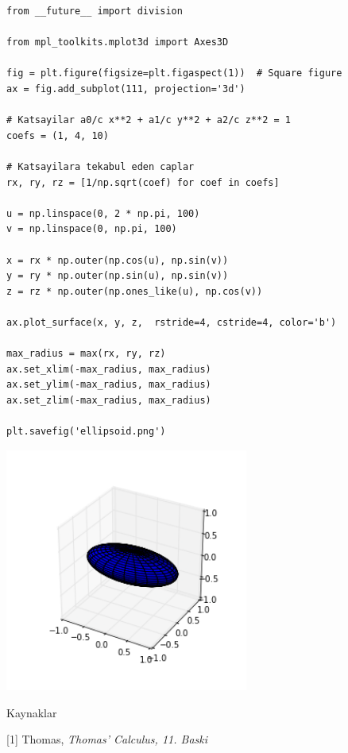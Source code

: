 \documentclass[12pt,fleqn]{article}\usepackage{../../common}
\begin{document}
\begin{verbatim}
from __future__ import division

from mpl_toolkits.mplot3d import Axes3D

fig = plt.figure(figsize=plt.figaspect(1))  # Square figure
ax = fig.add_subplot(111, projection='3d')

# Katsayilar a0/c x**2 + a1/c y**2 + a2/c z**2 = 1 
coefs = (1, 4, 10)  

# Katsayilara tekabul eden caplar
rx, ry, rz = [1/np.sqrt(coef) for coef in coefs]

u = np.linspace(0, 2 * np.pi, 100)
v = np.linspace(0, np.pi, 100)

x = rx * np.outer(np.cos(u), np.sin(v))
y = ry * np.outer(np.sin(u), np.sin(v))
z = rz * np.outer(np.ones_like(u), np.cos(v))

ax.plot_surface(x, y, z,  rstride=4, cstride=4, color='b')

max_radius = max(rx, ry, rz)
ax.set_xlim(-max_radius, max_radius)
ax.set_ylim(-max_radius, max_radius)
ax.set_zlim(-max_radius, max_radius)

plt.savefig('ellipsoid.png')
\end{verbatim}
\includegraphics[height=8cm]{ellipsoid.png}

Kaynaklar

[1] Thomas, {\em Thomas' Calculus, 11. Baski}
\end{document}
